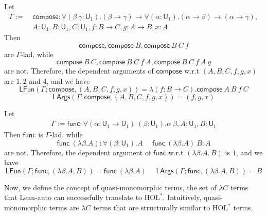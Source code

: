 \begin{example} Let
  \begin{align*}
    \Gamma := & \ \mathsf{compose} : \forall (\beta \ \gamma: \mathsf{U}_1).
      (\beta \to \gamma) \to \forall (\alpha : \mathsf{U}_1). (\alpha \to \beta) \to (\alpha \to \gamma), \\
      & \ A : \mathsf{U}_1, B : \mathsf{U}_1, C : \mathsf{U}_1, f : B \to C, g : A \to B, x : A
  \end{align*}
  Then
  $$\mathsf{compose}, \mathsf{compose} \ B, \mathsf{compose} \ B \ C \ f$$
  are $\Gamma$-lad, while
  $$\mathsf{compose} \ B \ C, \mathsf{compose} \ B \ C \ f \ A, \mathsf{compose} \ B \ C \ f \ A \ g$$
  are not. Therefore, the dependent arguments of $\mathsf{compose}$ w.r.t $(A, B, C, f, g, x)$
  are $1, 2$ and $4$, and we have
  $$\mathsf{LFun}(\Gamma; \mathsf{compose}, (A, B, C, f, g, x)) = \lambda (f : B \to C). \mathsf{compose} \ A \ B \ f \ C$$
  $$\mathsf{LArgs}(\Gamma; \mathsf{compose}, (A, B, C, f, g, x)) = (f, g, x)$$
\end{example}

\begin{example} Let
  \begin{align*}
    \Gamma := \mathsf{func} : \forall (\alpha : \mathsf{U}_1 \to \mathsf{U}_1) \ (\beta : \mathsf{U}_1). \alpha \ \beta,
      A : \mathsf{U}_1, B : \mathsf{U}_1 
  \end{align*}
  Then $\mathsf{func}$ is $\Gamma$-lad, while
  $$\mathsf{func} \ (\lambda \beta. A) : \forall (\beta : \mathsf{U}_1). A \ \ \ \ \ \
  \mathsf{func} \ (\lambda \beta. A) \ B : A$$
  are not. Therefore, the dependent argument of $\mathsf{func}$ w.r.t $(\lambda \beta. A, B)$ is $1$, and
  we have
  $$\mathsf{LFun}(\Gamma; \mathsf{func}, (\lambda \beta. A, B)) = \mathsf{func} \ (\lambda \beta . A) \ \ \ \ \ \
  \mathsf{LArgs}(\Gamma; \mathsf{func}, (\lambda \beta. A, B)) = B$$
\end{example}

  Now, we define the concept of quasi-monomorphic terms, the set of $\lambda C$ terms
  that Lean-auto can successfully translate to $\text{HOL}^*$. Intuitively, quasi-monomorphic
  terms are $\lambda C$ terms that are structurally similar to $\text{HOL}^*$ terms.

